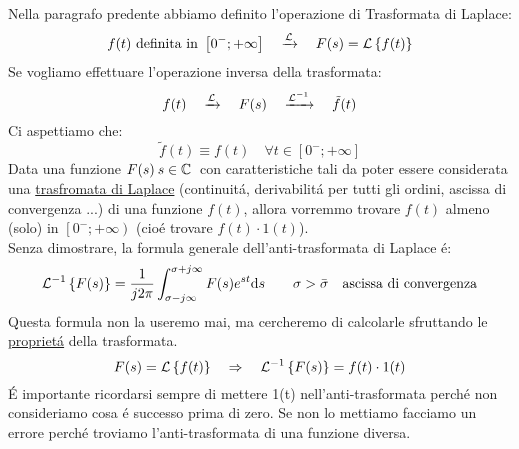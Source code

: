 \documentclass[../main.tex]{subfiles}
\begin{document}
	Nella paragrafo predente abbiamo definito l'operazione di Trasformata di Laplace:
	$$\Lapl{f(t)\ \text{definita in}\ \left[ 0^-;+\infty \right]}{F(s)=\Lbrace{f(t)}}  $$
	Se vogliamo effettuare l'operazione inversa della trasformata:
	$$ f(t) \quad \xrightarrow{\mathcal{L}} \quad F(s)  \quad \xrightarrow{\mathcal{L}^{-1}} \quad  \tilde{f}(t) $$
	Ci aspettiamo che: 
	$$ \tilde{f}(t) \equiv f(t) \quad \forall t \in \left[ 0^-;+\infty \right] $$
	\linebreak
	Data una funzione $ F(s)\: s \in \mathbb{C}\: $ con caratteristiche tali da poter essere considerata una \hyperref[sec:traformata_laplace]{trasfromata di Laplace} (continuit\'{a}, derivabilit\'{a} per tutti gli ordini, ascissa di convergenza ...) di una funzione $ f(t) $, allora vorremmo trovare $ f(t) $ almeno (solo) in $ \left[ 0^-;+\infty \right) $ (cio\'{e} trovare $ f(t) \cdot 1(t) $).\\
	\linebreak
	Senza dimostrare, la formula generale dell'anti-trasformata di Laplace \'{e}:
	\[ \mathcal{L}^{-1} \left\lbrace F(s) \right\rbrace = \frac{1}{j2\pi} \int_{ \sigma - j \infty }^{ \sigma + j \infty } F(s) e^{st} \mathrm{d}s \qquad \sigma > \bar{\sigma} \quad \text{ascissa di convergenza} \]
	Questa formula non la useremo mai, ma cercheremo di calcolarle sfruttando le \hyperref[subsec:prop_laplace]{propriet\'{a}} della trasformata.
	\[ F(s) = \mathcal{L} \left\lbrace f(t) \right\rbrace \quad \Rightarrow \quad \mathcal{L}^{-1} \left\lbrace F(s) \right\rbrace = f(t) \cdot 1(t) \]
	\'{E} importante ricordarsi sempre di mettere 1(t) nell'anti-trasformata perch\'{e} non consideriamo cosa \'{e} successo prima di zero. Se non lo mettiamo facciamo un errore perch\'{e} troviamo l'anti-trasformata di una funzione diversa. 
\end{document}
